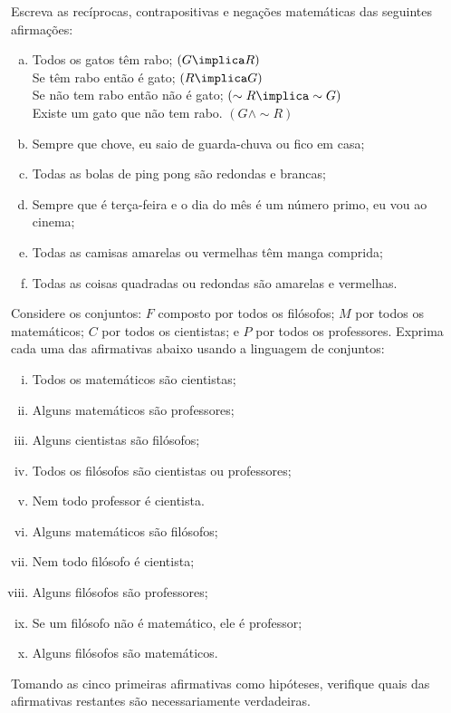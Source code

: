 \begin{exercise}
  \label{exe:escrever-reciprocas}
  Escreva as recíprocas, contrapositivas e negações matemáticas das seguintes afirmações:
  \begin{enumerate}[a)]
    \item Todos os gatos têm rabo; $\left(G \implica R \right)$\\
     Se têm rabo então é gato; $\left(R \implica G \right)$\\
     Se não tem rabo então não é gato; $\left(\sim R \implica \sim G \right)$\\
     Existe um gato que não tem rabo. $\left(G \land \sim R \right)$
    \item Sempre que chove, eu saio de guarda-chuva ou fico em casa;
    \item Todas as bolas de ping pong são redondas e brancas;
    \item Sempre que é terça-feira e o dia do mês é um número primo, eu vou ao cinema;
    \item Todas as camisas amarelas ou vermelhas têm manga comprida;
    \item Todas as coisas quadradas ou redondas são amarelas e
    vermelhas.
  \end{enumerate}
\end{exercise}

\begin{exercise}
  Considere os conjuntos: $F$ composto por todos os filósofos; $M$ por todos os matemáticos; $C$ por todos os cientistas; e $P$ por todos os professores. Exprima cada uma das afirmativas abaixo usando a linguagem de conjuntos:
  \begin{enumerate}[(i)]
    \item Todos os matemáticos são cientistas;
    \item Alguns matemáticos são professores;
    \item Alguns cientistas são filósofos; 
    \item Todos os filósofos são cientistas ou professores;
    \item Nem todo professor é cientista.
    \item Alguns matemáticos são filósofos;
    \item Nem todo filósofo é cientista;
    \item Alguns filósofos são professores;
    \item Se um filósofo não é matemático, ele é professor;
    \item Alguns filósofos são matemáticos.
  \end{enumerate}
  Tomando as cinco primeiras afirmativas como hipóteses, verifique quais das afirmativas restantes são necessariamente verdadeiras.
\end{exercise}

